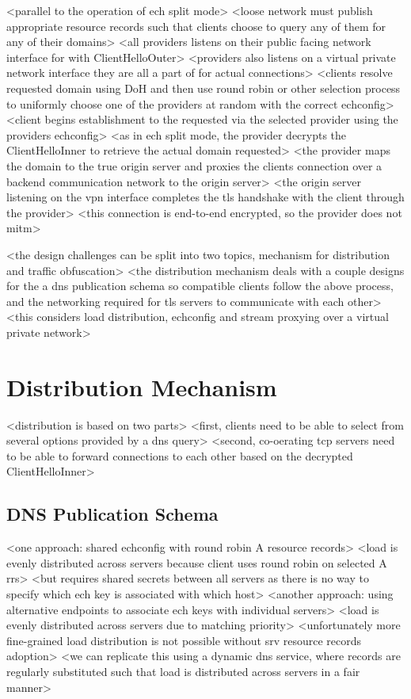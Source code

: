 <parallel to the operation of ech split mode>
<loose network must publish appropriate resource records such that clients choose to query any of them for any of their domains>
<all providers listens on their public facing network interface for with ClientHelloOuter>
<providers also listens on a virtual private network interface they are all a part of for actual connections>
<clients resolve requested domain using DoH and then use round robin or other selection process to uniformly choose one of the providers at random with the correct echconfig>
<client begins establishment to the requested via the selected provider using the providers echconfig>
<as in ech split mode, the provider decrypts the ClientHelloInner to retrieve the actual domain requested>
<the provider maps the domain to the true origin server and proxies the clients connection over a backend communication network to the origin server>
<the origin server listening on the vpn interface completes the tls handshake with the client through the provider>
<this connection is end-to-end encrypted, so the provider does not mitm>

<the design challenges can be split into two topics, mechanism for distribution and traffic obfuscation>
<the distribution mechanism deals with a couple designs for the a dns publication schema so compatible clients follow the above process, and the networking required for tls servers to communicate with each other>
<this considers load distribution, echconfig and stream proxying over a virtual private network>







\section{Distribution Mechanism}

<distribution is based on two parts>
<first, clients need to be able to select from several options provided by a dns query>
<second, co-oerating tcp servers need to be able to forward connections to each other based on the decrypted ClientHelloInner>

\subsection{DNS Publication Schema}

<one approach: shared echconfig with round robin A resource records>
<load is evenly distributed across servers because client uses round robin on selected A rrs>
<but requires shared secrets between all servers as there is no way to specify which ech key is associated with which host>
<another approach: using alternative endpoints to associate ech keys with individual servers>
<load is evenly distributed across servers due to matching priority>
<unfortunately more fine-grained load distribution is not possible without srv resource records adoption>
<we can replicate this using a dynamic dns service, where records are regularly substituted such that load is distributed across servers in a fair manner>

